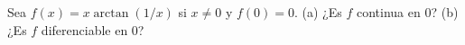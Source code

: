 \item Sea $f(x) = x \arctan(1/x)$ si $x \ne 0$ y $f(0) = 0$. (a) ¿Es $f$ continua en 0? (b) ¿Es $f$ diferenciable en 0?
